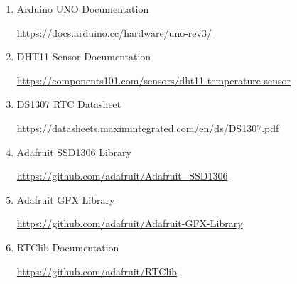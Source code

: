 \begin{enumerate}

\item Arduino UNO Documentation

\url{https://docs.arduino.cc/hardware/uno-rev3/}

\item DHT11 Sensor Documentation

\url{https://components101.com/sensors/dht11-temperature-sensor}

\item DS1307 RTC Datasheet

\url{https://datasheets.maximintegrated.com/en/ds/DS1307.pdf}

\item Adafruit SSD1306 Library

\url{https://github.com/adafruit/Adafruit_SSD1306}

\item Adafruit GFX Library

\url{https://github.com/adafruit/Adafruit-GFX-Library}

\item RTClib Documentation

\url{https://github.com/adafruit/RTClib}

\end{enumerate}


\clearpage

